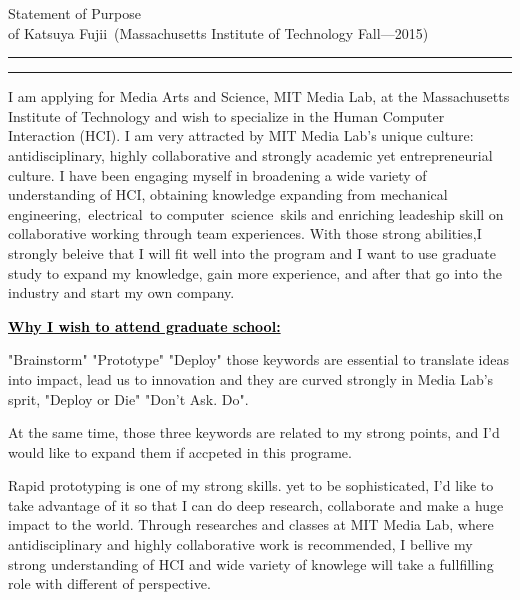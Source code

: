 \documentclass{article}
\newcommand{\soptitle}{Statement of Purpose}
\newcommand{\yourname}{Katsuya Fujii}
\newcommand{\statement}[1]{\par\medskip
  \underline{\textcolor{black}{\textbf{#1:}}}\space
}
\begin{document}
\begin{center}\LARGE\soptitle\\
\large of \yourname\ (Massachusetts Institute of Technology Fall---2015)
\end{center}

\hrule
\vspace{1pt}
\hrule height 1pt

\bigskip


I am applying for Media Arts and Science, MIT Media Lab, at the Massachusetts Institute of Technology and wish to specialize in the Human Computer Interaction (HCI). I am very attracted by MIT Media Lab's unique culture: antidisciplinary, highly collaborative and strongly academic yet entrepreneurial culture. I have been engaging myself in broadening a wide variety of understanding of HCI, obtaining knowledge expanding from mechanical 
engineering, electrical to computer science skils and enriching leadeship skill on collaborative working through team experiences. With those strong abilities,I strongly beleive that I will fit well into the program and I want to use graduate study to expand my knowledge, gain more experience, and after that go into the industry and start my own company.


\statement{Why I wish to attend graduate school} 
"Brainstorm" "Prototype" "Deploy" those keywords are essential to translate ideas into impact, lead us to innovation and they are curved strongly in Media Lab's sprit, "Deploy or Die"  "Don't Ask. Do".
 
 
At the same time, those three keywords are related to my strong points, and I'd would like to expand them if accpeted in this programe.


Rapid prototyping is one of my strong skills. yet to be sophisticated, I'd like to take advantage of it so that I can do deep research, collaborate and make a huge impact to the world. Through researches and classes at MIT Media Lab, where antidisciplinary and highly collaborative work is recommended, I bellive my strong understanding of HCI and wide variety of knowlege will take a fullfilling role with different of perspective. 
\end{document}

